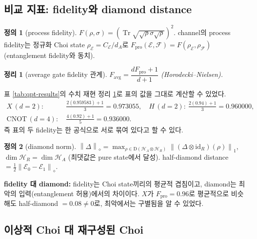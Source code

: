 \documentclass[11pt,a4paper]{article}
\newcommand{\E}{\mathcal{E}}
\newcommand{\Hcal}{\mathcal{H}}
\newcommand{\Tr}{\operatorname{Tr}}
\newcommand{\id}{\mathrm{id}}
\newcommand{\Dens}{\mathrm{D}}
\newcommand{\diamondnorm}[1]{\left\lVert #1 \right\rVert_{\diamond}}
\newcommand{\onenorm}[1]{\left\lVert #1 \right\rVert_{1}}
\theoremstyle{definition}
\newtheorem{definition}{정의}[section]
\theoremstyle{plain}
\newtheorem{theorem}{정리}[section]
\theoremstyle{remark}
\begin{document}
\subsection{비교 지표: fidelity와 diamond distance}

\begin{definition}[process fidelity]
$F(\rho,\sigma)=(\Tr\sqrt{\sqrt\rho\sigma\sqrt\rho})^2$. channel의 process fidelity는 정규화 Choi state $\rho_\E=C_\E/d_A$로 $F_{\mathrm{pro}}(\E,\mathcal F)=F(\rho_\E,\rho_{\mathcal F})$ (entanglement fidelity와 동치).
\end{definition}

\begin{theorem}[average gate fidelity 관계]\label{thm:favg}
$\boxed{F_{\mathrm{avg}}=\dfrac{dF_{\mathrm{pro}}+1}{d+1}}$ (Horodecki--Nielsen).
\end{theorem}

\begin{mathbox}{표 \ref{tab:qpt-results}의 수치 재현}
정리 \ref{thm:favg}로 표의 값을 그대로 계산할 수 있었다.
\begin{align*}
X\,(d{=}2):&\ \tfrac{2(0.959583)+1}{3}=0.973055,\quad
H\,(d{=}2):\ \tfrac{2(0.94)+1}{3}=0.960000,\\
\mathrm{CNOT}\,(d{=}4):&\ \tfrac{4(0.92)+1}{5}=0.936000.
\end{align*}
즉 표의 두 fidelity는 한 공식으로 서로 묶여 있다고 할 수 있다.
\end{mathbox}

\begin{definition}[diamond norm]
$\diamondnorm{\Delta}=\max_{\rho\in\Dens(\Hcal_A\otimes\Hcal_R)}\onenorm{(\Delta\otimes\id_R)(\rho)}$, $\dim\Hcal_R=\dim\Hcal_A$ (최댓값은 pure state에서 달성). half-diamond distance $=\tfrac12\diamondnorm{\E_0-\E_1}$.
\end{definition}

\begin{intuitionbox}
\textbf{fidelity 대 diamond:} fidelity는 Choi state끼리의 평균적 겹침이고, diamond는 최악의 입력(entanglement 허용)에서의 차이이다. $X$가 $F_{\mathrm{pro}}=0.96$로 평균적으로 비슷해도 half-diamond $=0.08\neq0$로, 최악에서는 구별됨을 알 수 있었다.
\end{intuitionbox}

\subsection{이상적 Choi 대 재구성된 Choi}
\end{document}
